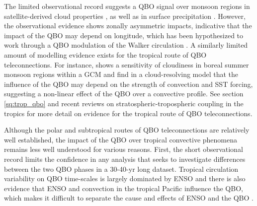 The limited observational record suggests a QBO signal over monsoon regions  in satellite-derived  cloud properties \citep{collimore2003,liess2012}, as well as in surface precipitation \citep{gray2018}.
However,  the observational evidence shows zonally asymmetric impacts, indicative that the impact of the QBO may depend on longitude, which has been hypothesized \citep[e.g. by][]{collimore2003,liess2012} to work through a QBO modulation of the Walker circulation \citep{hitchman2021observational}.
A similarly limited amount of modelling evidence exists for the tropical route of QBO teleconnections. For instance,  \cite{giorgetta1999} shows a sensitivity of cloudiness in boreal summer monsoon regions within a GCM and 
\cite{nie2015} find in a cloud-resolving model that the influence of the QBO may depend on the strength of convection and SST forcing, suggesting a non-linear effect of the QBO over a convective profile.  See section \ref{sq:trop_qbo} and recent reviews on stratospheric-tropospheric coupling in the tropics \citep{hitchman2021observational,haynes2021influence} for more detail on evidence for the tropical route of QBO teleconnections. 
 
 
Although the polar and subtropical routes of QBO teleconnections are relatively well established, the impact of the QBO over tropical convective phenomena remains less well understood for various reasons. First, the short observational record limits the confidence in any analysis that seeks to investigate differences between the two QBO phases in a 30-40-yr long dataset. Tropical circulation variability on QBO time-scales is largely dominated by ENSO and there is also evidence that ENSO and convection in the tropical Pacific influence the QBO, which makes it difficult to separate the cause and effects of ENSO and the QBO \citep{schirber2015,christiansen2016,gray2018}. 
 


